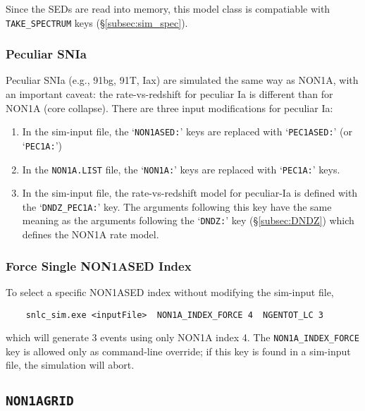 \documentclass[12pt]{article}
\begin{document}
Since the SEDs are read into memory, this model class is compatiable
with {\tt TAKE\_SPECTRUM} keys (\S\ref{subsec:sim_spec}).

\subsubsection{Peculiar SNIa}
\label{sss:pec1a}

Peculiar SNIa (e.g., 91bg, 91T, Iax) are simulated the
same way as NON1A, with an important caveat:
the rate-vs-redshift for peculiar Ia is different than
for NON1A (core collapse).
There are three input modifications for peculiar Ia:
%
\begin{enumerate}[noitemsep]
   \item In the sim-input file, the `{\tt NON1ASED:}' keys are replaced
         with `{\tt PEC1ASED:}' (or `{\tt PEC1A:}') 
   \item In the {\tt NON1A.LIST} file, the `{\tt NON1A:}' keys are 
          replaced with `{\tt PEC1A:}'  keys.
   \item In the sim-input file, the rate-vs-redshift model 
         for peculiar-Ia is defined with the `{\tt DNDZ\_PEC1A:}' key. 
         The arguments
         following this key have the same meaning as the
         arguments following the `{\tt DNDZ:}' key 
         (\S\ref{subsec:DNDZ}) which defines the NON1A rate model.
\end{enumerate}


\subsubsection{Force Single NON1ASED Index}
\label{sss:NON1A_INDEX_FORCE}

To select a specific NON1ASED index without modifying the sim-input file,
\begin{verbatim}
    snlc_sim.exe <inputFile>  NON1A_INDEX_FORCE 4  NGENTOT_LC 3
\end{verbatim}
%
which will generate 3 events using only NON1A index 4.
The {\tt NON1A\_INDEX\_FORCE} key is allowed only as command-line override;
if this key is found in a sim-input file, the simulation will abort.


\clearpage
\subsection{\tt NON1AGRID}
\label{subsec:NON1AGRID}
\end{document}

